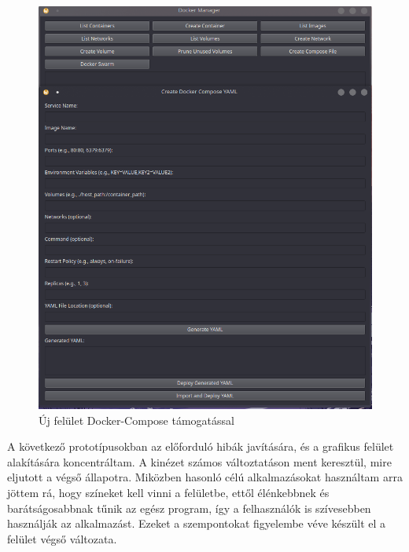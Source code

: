 \begin{figure}[H]
	\centering
	 \includegraphics[scale=0.3]{images/0.5}
	 \caption{Új felület Docker-Compose támogatással}
	 \label{fig:0.5}
\end{figure}

A következő prototípusokban az előforduló hibák javítására, és a grafikus felület alakítására koncentráltam. 
A kinézet számos változtatáson ment keresztül, mire eljutott a végső állapotra. Miközben hasonló célú alkalmazásokat használtam arra jöttem rá, hogy színeket kell vinni a felületbe, ettől élénkebbnek és barátságosabbnak tűnik az egész program, így a felhasználók is szívesebben használják az alkalmazást. Ezeket a szempontokat figyelembe véve készült el a felület végső változata.
\newpage
